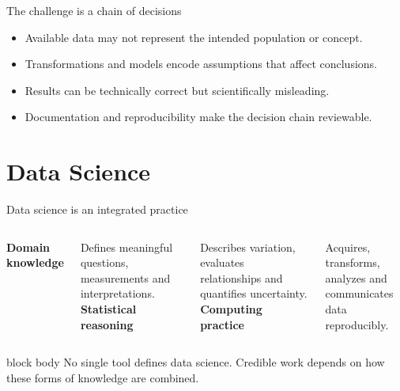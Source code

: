 \documentclass[10pt,aspectratio=169]{beamer}
\begin{document}
\begin{frame}{The challenge is a chain of decisions}
\small
\centering
{}
\vspace{0.45cm}
\raggedright
\begin{itemize}
  \item Available data may not represent the intended population or concept.
  \item Transformations and models encode assumptions that affect conclusions.
  \item Results can be technically correct but scientifically misleading.
  \item Documentation and reproducibility make the decision chain reviewable.
\end{itemize}
\end{frame}

\section{Data Science}

\begin{frame}{Data science is an integrated practice}
\small
\begin{columns}[T]
\centering
\textbf{Domain knowledge}

\scriptsize Defines meaningful questions, measurements and interpretations.
\centering
\textbf{Statistical reasoning}

\scriptsize Describes variation, evaluates relationships and quantifies uncertainty.
\centering
\textbf{Computing practice}

\scriptsize Acquires, transforms, analyzes and communicates data reproducibly.
\end{columns}
\vspace{0.65cm}
\begin{beamercolorbox}[rounded=true,sep=9pt]{block body}
No single tool defines data science. Credible work depends on how these forms of knowledge are combined.
\end{beamercolorbox}
\end{frame}
\end{document}
